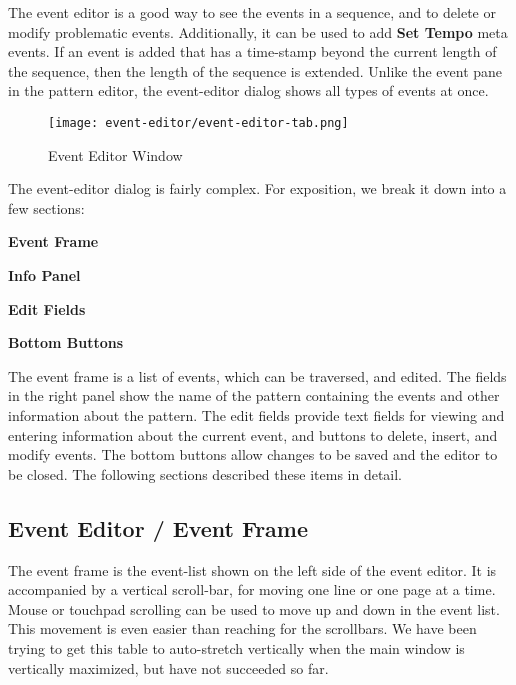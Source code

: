 
   The event editor is a good way to see the events in a sequence,
   and to delete or modify problematic events.
   Additionally, it can be used to add \textbf{Set Tempo} meta events.
   If an event is added that has a time-stamp beyond the current
   length of the sequence, then the length of the sequence is extended.
   Unlike the event pane in the pattern editor, the event-editor
   dialog shows all types of events at once.

\begin{figure}[H]
   \centering
   \texttt{[image: event-editor/event-editor-tab.png]}
   \caption{Event Editor Window}
   \label{fig:event_editor_window}
\end{figure}

   The event-editor dialog is fairly complex.
   For exposition, we break it down into a few sections:

   \begin{enumber}
      \item \textbf{Event Frame}
      \item \textbf{Info Panel}
      \item \textbf{Edit Fields}
      \item \textbf{Bottom Buttons}
   \end{enumber}

   The event frame is a list of events, which can be traversed, and edited.
   The fields in the right panel show the name of
   the pattern containing the events and other information about the
   pattern.  The edit fields provide text fields for viewing and entering
   information about the current event, and buttons to delete, insert, and
   modify events.  The bottom buttons allow changes to be saved and the editor
   to be closed.  
   The following sections described these items in detail.

\subsection{Event Editor / Event Frame}
\label{subsec:event_editor_frame}

   The event frame is the event-list shown on the left side of the
   event editor.  It is accompanied by a vertical scroll-bar, for moving one
   line or one page at a time.
   Mouse or touchpad scrolling can be used to move up and down
   in the event list.  This movement is even easier than reaching for the
   scrollbars.
   We have been trying to get this table to auto-stretch vertically when the
   main window is vertically maximized, but have not succeeded so far.

